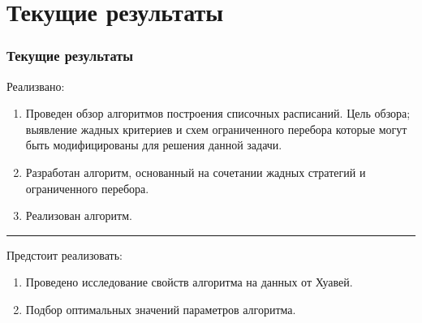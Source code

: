 \documentclass[hyperref=unicode, aspectratio=169]{beamer}
\begin{document}
\section{Текущие результаты}
\begin{frame}
    \frametitle{Текущие результаты}
    Реализвано:
    \begin{enumerate}
        \item Проведен обзор алгоритмов построения списочных расписаний. Цель обзора; выявление жадных критериев и схем ограниченного перебора которые могут быть модифицированы для решения данной задачи.
        \item Разработан алгоритм, основанный на сочетании жадных стратегий и ограниченного перебора.
        \item Реализован алгоритм.
    \end{enumerate}
    \vspace{0.3cm}
    \hrule
    \vspace{0.2cm}
    Предстоит реализовать:
    \begin{enumerate}
        \item Проведено исследование свойств алгоритма на данных от Хуавей.
        \item Подбор оптимальных значений параметров алгоритма.
    \end{enumerate}
\end{frame}
\end{document}
